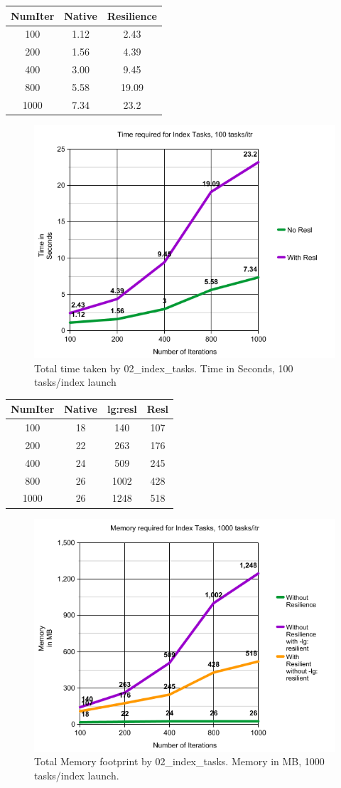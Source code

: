 \begin{center}
 \begin{tabular}{||c | | c | c ||} 
 \hline
 NumIter& Native & Resilience \\ [0.25ex] 
 \hline\hline
100 &  1.12 & 2.43\\ 
 \hline
200 &  1.56 & 4.39\\ 
 \hline
400 &  3.00 & 9.45\\ 
 \hline
800 &  5.58 & 19.09\\ 
 \hline
1000 &  7.34 & 23.2 \\ [1ex] 
 \hline
\end{tabular}
\end{center}

\begin{figure}
\includegraphics[width=.45\textwidth]{images/index_tasks_time2.png}
\caption{Total time taken by 02\_index\_tasks. Time in Seconds, 100 tasks/index launch }
\end{figure}




\begin{center}
 \begin{tabular}{||c | c | c | c||} 
 \hline
 NumIter& Native & lg:resl & Resl \\ [0.25ex] 
 \hline\hline
100 &  18 & 140 & 107 \\ 
 \hline
200 &  22 & 263 & 176 \\ 
 \hline
400 &  24 & 509 & 245 \\ 
 \hline
800 &  26 & 1002 & 428\\ 
 \hline
1000 & 26 & 1248 & 518\\ [1ex] 
 \hline
\end{tabular}
\end{center}

\begin{figure}
\includegraphics[width=.45\textwidth]{images/index_tasks_memory.png}
\caption{Total Memory footprint by 02\_index\_tasks. Memory in MB, 1000 tasks/index launch.}
\end{figure}





